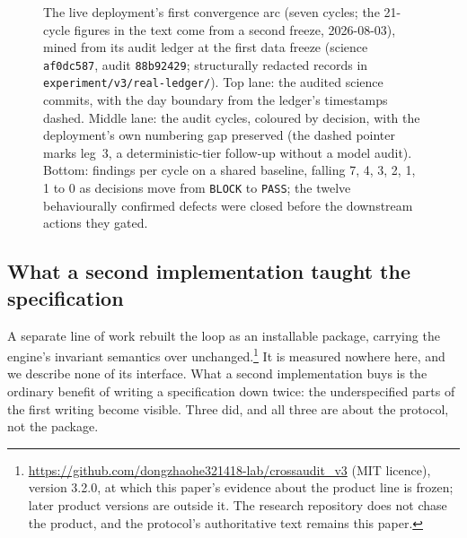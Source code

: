 \documentclass[11pt]{article}
\begin{document}
\begin{figure}[t]
{}
\caption{The live deployment's first convergence arc (seven cycles; the 21-cycle figures in the text come from a second freeze, 2026-08-03), mined from its audit ledger at the first data freeze (science \texttt{af0dc587}, audit \texttt{88b92429}; structurally redacted records in \texttt{experiment/v3/real-ledger/}). Top lane: the audited science commits, with the day boundary from the ledger's timestamps dashed. Middle lane: the audit cycles, coloured by decision, with the deployment's own numbering gap preserved (the dashed pointer marks leg~3, a deterministic-tier follow-up without a model audit). Bottom: findings per cycle on a shared baseline, falling 7, 4, 3, 2, 1, 1 to 0 as decisions move from \texttt{BLOCK} to \texttt{PASS}; the twelve behaviourally confirmed defects were closed before the downstream actions they gated.}
\label{fig:trace}
\end{figure}

\subsection{What a second implementation taught the specification}\label{sec:productline}

A separate line of work rebuilt the loop as an installable package, carrying the engine's invariant semantics over unchanged.\footnote{\url{https://github.com/dongzhaohe321418-lab/crossaudit_v3} (MIT licence), version 3.2.0, at which this paper's evidence about the product line is frozen; later product versions are outside it. The research repository does not chase the product, and the protocol's authoritative text remains this paper.} It is measured nowhere here, and we describe none of its interface. What a second implementation buys is the ordinary benefit of writing a specification down twice: the underspecified parts of the first writing become visible. Three did, and all three are about the protocol, not the package.
\end{document}

